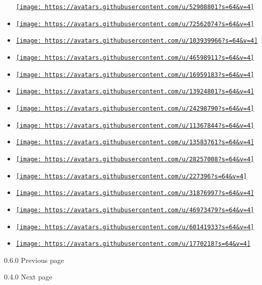 \begin{itemize}
  \href{https://github.com/alixmacdonald10}{\texttt{[image: https://avatars.githubusercontent.com/u/52908801?s=64\&v=4]}}
\item
  \href{https://github.com/coughmedicine}{\texttt{[image: https://avatars.githubusercontent.com/u/72562074?s=64\&v=4]}}
\item
  \href{https://github.com/epbuennig}{\texttt{[image: https://avatars.githubusercontent.com/u/103939966?s=64\&v=4]}}
\item
  \href{https://github.com/erikwastaken}{\texttt{[image: https://avatars.githubusercontent.com/u/46598911?s=64\&v=4]}}
\item
  \href{https://github.com/glocq}{\texttt{[image: https://avatars.githubusercontent.com/u/16959183?s=64\&v=4]}}
\item
  \href{https://github.com/howjmay}{\texttt{[image: https://avatars.githubusercontent.com/u/13924801?s=64\&v=4]}}
\item
  \href{https://github.com/jassler}{\texttt{[image: https://avatars.githubusercontent.com/u/24298790?s=64\&v=4]}}
\item
  \href{https://github.com/lino-levan}{\texttt{[image: https://avatars.githubusercontent.com/u/11367844?s=64\&v=4]}}
\item
  \href{https://github.com/lucifer1004}{\texttt{[image: https://avatars.githubusercontent.com/u/13583761?s=64\&v=4]}}
\item
  \href{https://github.com/matthiasGmayer}{\texttt{[image: https://avatars.githubusercontent.com/u/28257008?s=64\&v=4]}}
\item
  \href{https://github.com/naim94a}{\texttt{[image: https://avatars.githubusercontent.com/u/227396?s=64\&v=4]}}
\item
  \href{https://github.com/ollema}{\texttt{[image: https://avatars.githubusercontent.com/u/31876997?s=64\&v=4]}}
\item
  \href{https://github.com/sbatial}{\texttt{[image: https://avatars.githubusercontent.com/u/46973479?s=64\&v=4]}}
\item
  \href{https://github.com/sitandr}{\texttt{[image: https://avatars.githubusercontent.com/u/60141933?s=64\&v=4]}}
\item
  \href{https://github.com/xiongmao86}{\texttt{[image: https://avatars.githubusercontent.com/u/1770218?s=64\&v=4]}}
\end{itemize}

\href{/docs/changelog/0.6.0/}{\pandocbounded{}}

{ 0.6.0 } { Previous page }

\href{/docs/changelog/0.4.0/}{\pandocbounded{}}

{ 0.4.0 } { Next page }
